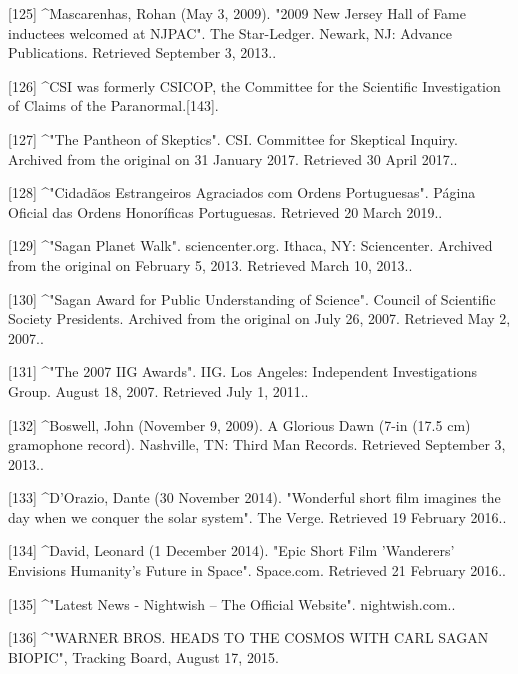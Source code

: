 [125]
^Mascarenhas, Rohan (May 3, 2009). "2009 New Jersey Hall of Fame inductees welcomed at NJPAC". The Star-Ledger. Newark, NJ: Advance Publications. Retrieved September 3, 2013..

[126]
^CSI was formerly CSICOP, the Committee for the Scientific Investigation of Claims of the Paranormal.[143].

[127]
^"The Pantheon of Skeptics". CSI. Committee for Skeptical Inquiry. Archived from the original on 31 January 2017. Retrieved 30 April 2017..

[128]
^"Cidadãos Estrangeiros Agraciados com Ordens Portuguesas". Página Oficial das Ordens Honoríficas Portuguesas. Retrieved 20 March 2019..

[129]
^"Sagan Planet Walk". sciencenter.org. Ithaca, NY: Sciencenter. Archived from the original on February 5, 2013. Retrieved March 10, 2013..

[130]
^"Sagan Award for Public Understanding of Science". Council of Scientific Society Presidents. Archived from the original on July 26, 2007. Retrieved May 2, 2007..

[131]
^"The 2007 IIG Awards". IIG. Los Angeles: Independent Investigations Group. August 18, 2007. Retrieved July 1, 2011..

[132]
^Boswell, John (November 9, 2009). A Glorious Dawn (7-in (17.5 cm) gramophone record). Nashville, TN: Third Man Records. Retrieved September 3, 2013..

[133]
^D'Orazio, Dante (30 November 2014). "Wonderful short film imagines the day when we conquer the solar system". The Verge. Retrieved 19 February 2016..

[134]
^David, Leonard (1 December 2014). "Epic Short Film 'Wanderers' Envisions Humanity's Future in Space". Space.com. Retrieved 21 February 2016..

[135]
^"Latest News - Nightwish – The Official Website". nightwish.com..

[136]
^"WARNER BROS. HEADS TO THE COSMOS WITH CARL SAGAN BIOPIC", Tracking Board, August 17, 2015.